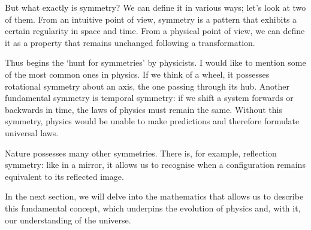 But what exactly is symmetry? We can define it in various ways; let's look at two of them. From an intuitive point of view, symmetry is a pattern that exhibits a certain regularity in space and time. From a physical point of view, we can define it as a property that remains unchanged following a transformation.

Thus begins the `hunt for symmetries' by physicists. I would like to mention some of the most common ones in physics. If we think of a wheel, it possesses rotational symmetry about an axis, the one passing through its hub. Another fundamental symmetry is temporal symmetry: if we shift a system forwards or backwards in time, the laws of physics must remain the same.  Without this symmetry, physics would be unable to make predictions and therefore formulate universal laws.

Nature possesses many other symmetries. There is, for example, reflection symmetry: like in a mirror, it allows us to recognise when a configuration remains equivalent to its reflected image.

In the next section, we will delve into the mathematics that allows us to describe this fundamental concept, which underpins the evolution of physics and, with it, our understanding of the universe.

